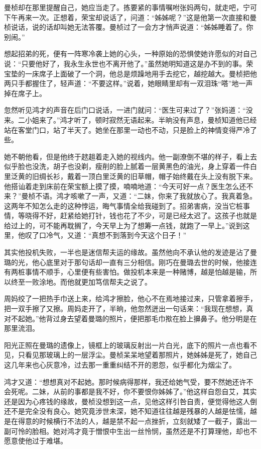 \par 曼桢却在那里提醒自己，她应当走了。拣要紧的事情嘱咐张妈两句，就走吧，宁可下午再来一次。正想着，荣宝却说话了，问道：“姊姊呢？”这是他第一次直接和曼桢说话，说的话却叫她无法答覆。曼桢过了一会方才悄声说道：“姊姊睡着了。你别闹。”
\par 想起招弟的死，便有一阵寒冷袭上她的心头，一种原始的恐惧使她许愿似的对自己说：“只要他好了，我永生永世也不离开他了。”虽然她明知道这是办不到的事。荣宝垫的一床席子上面破了一个洞，他总是烦躁地用手去挖它，越挖越大。曼桢把他两只手都握住了，轻声道：“不要这样。”说着，她眼睛里却有一双泪珠“嗒”地一声掉在席子上。
\par 忽然听见鸿才的声音在后门口说话，一进门就问：“医生可来过了？”张妈道：“没来。二小姐来了。”鸿才听了，顿时寂然无语起来。半晌没有声息，曼桢知道他已经站在客堂门口，站了半天了。她坐在那里一动也不动，只是脸上的神情变得严冷了些。
\par 她不朝他看，但是他终于趑趄着走入她的视线内。他一副潦倒不堪的样子，看上去似乎脸也没洗，胡子也没剃，瘦削的脸上腻着一层黄黑色的油光，身上穿着一件白里泛黄的旧绸长衫，戴着一顶白里泛黄的旧草帽，帽子始终戴在头上没有脱下来。他搭讪着走到床前在荣宝额上摸了摸，喃喃地道：“今天可好一点？医生怎么还不来？”曼桢不语。鸿才咳嗽了一声，又道：“二妹，你来了我就放心了。我真着急。这两年不知怎么走的这种悖运，晦气事情全给我碰到了。招弟害病，没当它桩事情，等晓得不好，赶紧给她打针，钱也花了不少，可是已经太迟了。这孩子也就是给过上的，可不能再耽搁了，今天早上为了想筹一点钱，就跑了一早上。”说到这里，他叹了口冷气，又道：“真想不到落到今天这个日子！”
\par 其实他投机失败，一半也是迷信帮夫运的缘故。虽然他向不承认他的发迹是沾了曼璐的光，他心底里对于那句话却一直有三分相信。刚巧在曼璐去世的时候，他接连有两桩事情不顺手，心里便有些害怕。做投机本来是一种赌博，越是怕越是输，所以终至一败涂地。而他就更加笃信帮夫之说了。
\par 周妈绞了一把热手巾送上来，给鸿才擦脸，他心不在焉地接过来，只管拿着擦手，把一双手擦了又擦。周妈走开了，半晌，他忽然迸出一句话来：“我现在想想，真对不起她。”他背过身去望着曼璐的照片，便把那毛巾揿在脸上擤鼻子。他分明是在那里流泪。
\par 阳光正照在曼璐的遗像上，镜框上的玻璃反射出一片白光，底下的照片一点也看不见，只看见那玻璃上的一层浮尘。曼桢呆呆地望着那照片，她姊姊是死了，她自己这几年来也心灰意冷，过去那一重重纠结不开的恩怨，似乎都化为烟尘了。
\par 鸿才又道：“想想真对不起她。那时候病得那样，我还给她气受，要不然她还许不会死呢。二妹，从前的事都是我不好，你不要恨你姊姊了。”他这样自怨自艾，其实还是因为心疼钱的缘故，曼桢没想到这一点，见他这样引咎自责，便觉得他这人倒还不是完全没有良心。她究竟涉世未深，她不知道往往越是残暴的人越是怯懦，越是在得意的时候横行不法的人，越是禁不起一点挫折，立刻就矮了一截子，露出一副可怜的脸相。她对鸿才竟于憎恨中生出一丝怜悯，虽然还是不打算理他，却也不愿意使他过于难堪。
